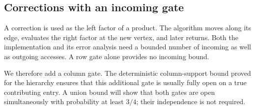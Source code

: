 \documentclass[11pt]{article}
\numberwithin{equation}{section}
\theoremstyle{definition}
\theoremstyle{remark}
\begin{document}
\subsection{Corrections with an incoming gate}

A correction is used as the left factor of a product. The algorithm moves along its edge, evaluates the right factor at the new vertex, and later returns. Both the implementation and its error analysis need a bounded number of incoming as well as outgoing accesses. A row gate alone provides no incoming bound.

We therefore add a column gate. The deterministic column-support bound proved for the hierarchy ensures that this additional gate is usually fully open on a true contributing entry. A union bound will show that both gates are open simultaneously with probability at least $3/4$; their independence is not required.
\end{document}
